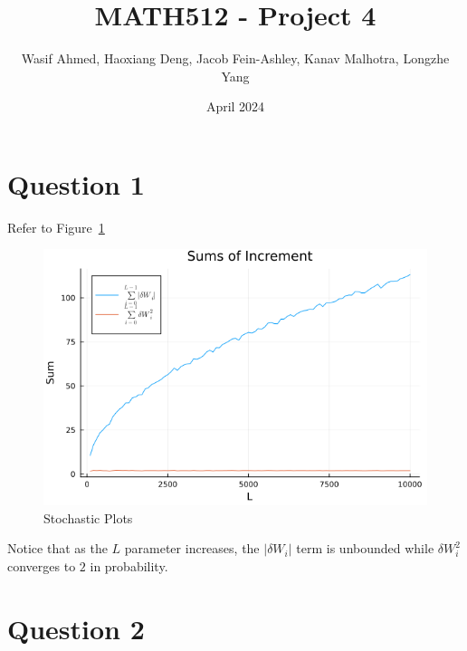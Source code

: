 \documentclass{article}
\title{MATH512 - Project 4}
\author{Wasif Ahmed, Haoxiang Deng, Jacob Fein-Ashley, Kanav Malhotra, Longzhe Yang}
\date{April 2024}
\begin{document}
\maketitle

\section*{Question 1}

Refer to Figure~\ref{fig:convergence1}

\begin{figure}[H]
    \centering
    \includegraphics[scale=0.6]{imgs/convergence1.png}
    \caption{Stochastic Plots}
    \label{fig:convergence1}
\end{figure}

Notice that as the $L$ parameter increases, the $|\delta W_i|$ term is unbounded while $\delta W_i^2$ converges to $2$ in probability.

\section*{Question 2}
\end{document}
